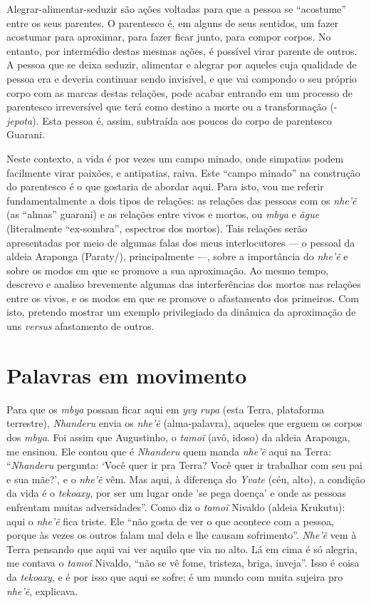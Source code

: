 Alegrar-alimentar-seduzir são ações voltadas para que a pessoa se
``acostume'' entre os seus parentes. O parentesco é, em alguns de seus
sentidos, um fazer acostumar para aproximar, para fazer ficar junto,
para compor corpos. No entanto, por intermédio destas mesmas ações, é
possível virar parente de outros. A pessoa que se deixa seduzir,
alimentar e alegrar por aqueles cuja qualidade de pessoa era e deveria
continuar sendo invisível, e que vai compondo o seu próprio corpo com
as marcas destas relações, pode acabar entrando em um processo de
parentesco irreversível que terá como destino a morte ou a
transformação (-\emph{jepota}). Esta pessoa é, assim, subtraída aos poucos do
corpo de parentesco Guarani.

Neste contexto, a vida é por vezes um campo minado, onde simpatias podem
facilmente virar paixões, e antipatias, raiva. Este ``campo minado'' na
construção do parentesco é o que gostaria de abordar aqui. Para isto,
vou me referir fundamentalmente a dois tipos de relações: as relações
das pessoas com os \emph{nhe’ẽ} (as ``almas'' guarani) e as relações entre
vivos e mortos, ou \emph{mbya} e \emph{ãgue} (literalmente ``ex-sombra'', espectros dos
mortos). Tais relações serão apresentadas por meio de algumas falas dos
meus interlocutores --- o pessoal da aldeia Araponga (Paraty/),
principalmente ---, sobre a importância do \emph{nhe’ẽ} e sobre os modos
em que se promove a sua aproximação. Ao mesmo tempo, descrevo e analiso
brevemente algumas das interferências dos mortos nas relações entre os
vivos, e os modos em que se promove o afastamento dos primeiros. Com
isto, pretendo mostrar um exemplo privilegiado da dinâmica da
aproximação de uns \emph{versus} afastamento de outros.

\section{Palavras em movimento}

Para que os \emph{mbya} possam ficar aqui em \emph{yvy rupa} (esta Terra, plataforma
terrestre), \emph{Nhanderu} envia os \emph{nhe’ẽ} (alma-palavra), aqueles que
erguem os corpos dos \emph{mbya}. Foi assim que Augustinho, o \emph{tamoĩ} (avô,
idoso) da aldeia Araponga, me ensinou. Ele contou que é \emph{Nhanderu} quem
manda \emph{nhe’ẽ} aqui na Terra: ``\emph{Nhanderu} pergunta: ‘Você quer ir pra
Terra? Você quer ir trabalhar com seu pai e sua mãe?’, e o \emph{nhe’ẽ}
vêm. Mas aqui, à diferença do \emph{Yvate} (céu, alto), a condição da vida é o
\emph{tekoaxy}, por ser um lugar onde 'se pega doença' e onde as pessoas
enfrentam muitas adversidades''. Como diz o \emph{tamoĩ} Nivaldo (aldeia
Krukutu): aqui o \emph{nhe’ẽ} fica triste. Ele ``não gosta de ver o que
acontece com a pessoa, porque às vezes os outros falam mal dela e lhe
causam sofrimento''. \emph{Nhe’ẽ} vem à Terra pensando que aqui vai ver
aquilo que via no alto. Lá em cima é só
alegria, me contava o \emph{tamoĩ} Nivaldo, ``não se vê
fome, tristeza, briga, inveja''. Isso é coisa da \emph{tekoaxy}, e é por isso
que aqui se sofre; é um mundo com muita sujeira pro
\emph{nhe’ẽ}, explicava. 

